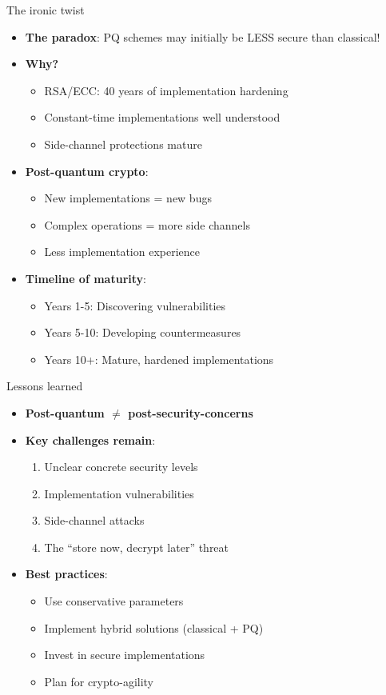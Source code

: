 \documentclass[aspectratio=169, lualatex, handout]{beamer}
\begin{document}
\begin{frame}{The ironic twist}
	\begin{itemize}
		\item \textbf{The paradox}: PQ schemes may initially be LESS secure than classical!
		\item \textbf{Why?}
		      \begin{itemize}
			      \item RSA/ECC: 40 years of implementation hardening
			      \item Constant-time implementations well understood
			      \item Side-channel protections mature
		      \end{itemize}
		\item \textbf{Post-quantum crypto}:
		      \begin{itemize}
			      \item New implementations = new bugs
			      \item Complex operations = more side channels
			      \item Less implementation experience
		      \end{itemize}
		\item \textbf{Timeline of maturity}:
		      \begin{itemize}
			      \item Years 1-5: Discovering vulnerabilities
			      \item Years 5-10: Developing countermeasures
			      \item Years 10+: Mature, hardened implementations
		      \end{itemize}
	\end{itemize}
\end{frame}

\begin{frame}{Lessons learned}
	\begin{itemize}
		\item \textbf{Post-quantum $\neq$ post-security-concerns}
		\item \textbf{Key challenges remain}:
		      \begin{enumerate}
			      \item Unclear concrete security levels
			      \item Implementation vulnerabilities
			      \item Side-channel attacks
			      \item The ``store now, decrypt later'' threat
		      \end{enumerate}
		\item \textbf{Best practices}:
		      \begin{itemize}
			      \item Use conservative parameters
			      \item Implement hybrid solutions (classical + PQ)
			      \item Invest in secure implementations
			      \item Plan for crypto-agility
		      \end{itemize}
	\end{itemize}
\end{frame}

\begin{frame}[plain]
	\titlepage
\end{frame}
\end{document}
